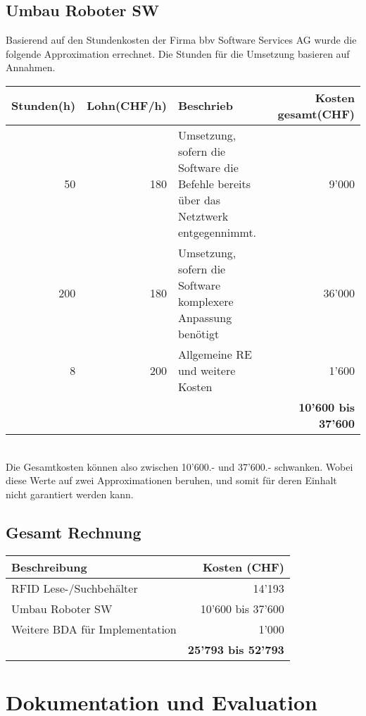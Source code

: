 \section{Umbau Roboter SW}
Basierend auf den Stundenkosten der Firma bbv Software Services AG wurde die folgende Approximation errechnet.
Die Stunden für die Umsetzung basieren auf Annahmen.

\begin{tabularx}{\textwidth}{|r|r|X|r|}
	\hline 
	\textbf{Stunden(h)} & \textbf{Lohn(CHF/h)} & \textbf{Beschrieb} & \textbf{Kosten gesamt(CHF)} \\
	\hline 
	50 & 180 & Umsetzung, sofern die Software die Befehle bereits über das Netztwerk entgegennimmt. & 9'000 \\
	\hline
	200 & 180 & Umsetzung, sofern die Software komplexere Anpassung benötigt & 36'000 \\
	\hline
	8 & 200 & Allgemeine RE und weitere Kosten & 1'600 \\
	\hline	
	& & & \textbf{10'600 bis 37'600} \\ 
	\hline
\end{tabularx}
\\
Die Gesamtkosten können also zwischen 10'600.- und 37'600.- schwanken. Wobei diese Werte auf zwei Approximationen beruhen, und somit für deren Einhalt nicht garantiert werden kann.

\section{Gesamt Rechnung}
\begin{tabularx}{\textwidth}{|X|r|}
	\hline
	\textbf{Beschreibung} & \textbf{Kosten (CHF)} \\
	\hline
	RFID Lese-/Suchbehälter & 14'193 \\
	\hline
	Umbau Roboter SW & 10'600 bis 37'600 \\
	\hline
	Weitere BDA für Implementation & 1'000 \\
	\hline
	& \textbf{25'793 bis 52'793} \\
	\hline
\end{tabularx}


\chapter{Dokumentation und Evaluation}